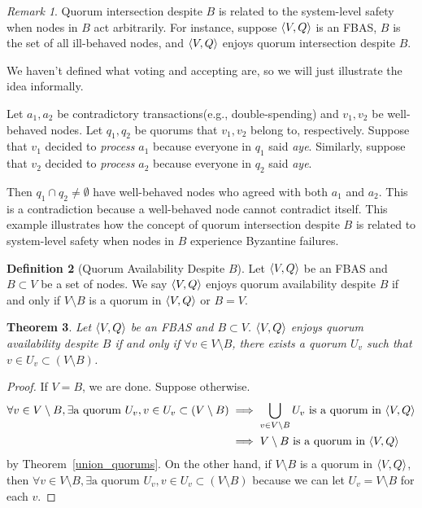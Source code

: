 \documentclass[12pt, psamsfonts]{amsart}
\newtheorem{thm}{Theorem}[subsection]
\theoremstyle{definition}
\newtheorem{defn}[thm]{Definition}
\theoremstyle{remark}
\newtheorem{rem}[thm]{Remark}
\numberwithin{equation}{subsection}
\begin{document}
\begin{rem}
    Quorum intersection despite $B$ is related to the system-level safety when nodes in $B$ act arbitrarily.
    For instance, suppose $\ev{V, Q}$ is an FBAS, $B$ is the set of all ill-behaved nodes, and $\ev{V, Q}$ enjoys quorum intersection despite $B$.

    We haven't defined what voting and accepting are, so we will just illustrate the idea informally.

    Let $a_1, a_2$ be contradictory transactions(e.g., double-spending) and $v_1, v_2$ be well-behaved nodes.
    Let $q_1, q_2$ be quorums that $v_1, v_2$ belong to, respectively.
    Suppose that $v_1$ decided to \textit{process} $a_1$ because everyone in $q_1$ said \textit{aye}.
    Similarly, suppose that $v_2$ decided to \textit{process} $a_2$ because everyone in $q_2$ said \textit{aye}.


    Then $q_1 \cap q_2 \ne \emptyset$ have well-behaved nodes who agreed with both $a_1$ and $a_2$.
    This is a contradiction because a well-behaved node cannot contradict itself.
    This example illustrates how the concept of quorum intersection despite $B$ is related to system-level safety when nodes in $B$ experience Byzantine failures.
\end{rem}

\begin{defn}[Quorum Availability Despite $B$]\label{def_quorum_availability}
    Let $\ev{V, Q}$ be an FBAS and $B \subset V$ be a set of nodes.
    We say $\ev{V, Q}$ enjoys quorum availability despite $B$ if and only if $V \setminus B$ is a quorum in $\ev{V, Q}$ or $B = V$.
\end{defn}

\begin{thm}\label{quorum_availability_equivalence_condition}
    Let $\ev{V, Q}$ be an FBAS and $B \subset V$.
    $\ev{V, Q}$ enjoys quorum availability despite $B$ if and only if $\forall v \in V \setminus B$, there exists a quorum $U_v$ such that $v \in U_v \subset (V \setminus B)$.
\end{thm}

\begin{proof}
    If $V = B$, we are done.
    Suppose otherwise.
    \begin{align*}
        \forall v \in V \setminus B, \exists \text{a quorum $U_v$}, v \in U_v \subset (V \setminus B)
            &\implies \bigcup_{v \in V \setminus B} U_v \text{ is a quorum in $\ev{V, Q}$} \\
            &\implies \text{$V \setminus B$ is a quorum in $\ev{V, Q}$}
    \end{align*}
    by Theorem~\ref{union_quorums}.
    On the other hand, if $V \setminus B$ is a quorum in $\ev{V, Q}$, then $\forall v \in V \setminus B, \exists \text{a quorum $U_v$}, v \in U_v \subset (V \setminus B)$ because we can let $U_v = V \setminus B$ for each $v$.
\end{proof}
\end{document}
